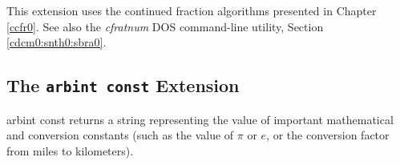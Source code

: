 \begin{tclcommandseealso}
This extension uses the continued fraction
algorithms presented in Chapter \ccfrzeroxrefhyphen{}\ref{ccfr0}.
See also the \emph{cfratnum} DOS command-line utility, 
Section \cdcmzeroxrefhyphen{}\ref{cdcm0:snth0:sbra0}.
\end{tclcommandseealso}


\subsection{The \texttt{arbint const} Extension}
\label{cxtn0:snth0:scex0}

\begin{tclcommandname}{arbint const}%
returns a string representing the value of important
mathematical and conversion constants (such as the value
of $\pi$ or $e$, or the conversion factor from miles to kilometers).
\end{tclcommandname}

\begin{tclcommandsynopsis}
\end{tclcommandsynopsis}

